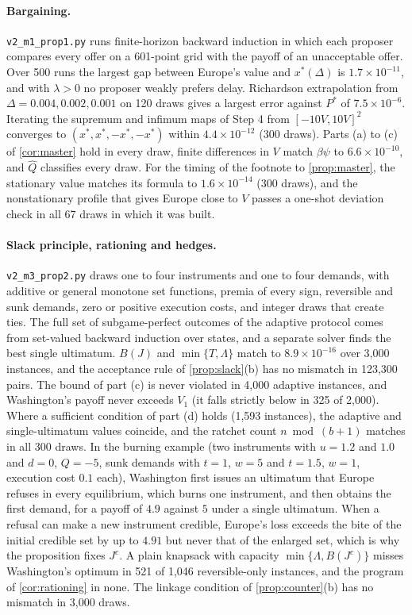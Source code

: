 \paragraph{Bargaining.} \texttt{v2\_m1\_prop1.py} runs finite-horizon backward induction in which each proposer compares every offer on a 601-point grid with the payoff of an unacceptable offer. Over 500 runs the largest gap between Europe's value and $x^*(\Delta)$ is $1.7\times10^{-11}$, and with $\lambda>0$ no proposer weakly prefers delay. Richardson extrapolation from $\Delta=0.004,0.002,0.001$ on 120 draws gives a largest error against $P^*$ of $7.5\times10^{-6}$. Iterating the supremum and infimum maps of Step 4 from $[-10V,10V]^2$ converges to $(x^*,x^*,-x^*,-x^*)$ within $4.4\times10^{-12}$ (300 draws). Parts (a) to (c) of \cref{cor:master} hold in every draw, finite differences in $V$ match $\beta\psi$ to $6.6\times10^{-10}$, and $\hat Q$ classifies every draw. For the timing of the footnote to \cref{prop:master}, the stationary value matches its formula to $1.6\times10^{-14}$ (300 draws), and the nonstationary profile that gives Europe close to $V$ passes a one-shot deviation check in all 67 draws in which it was built.

\paragraph{Slack principle, rationing and hedges.} \texttt{v2\_m3\_prop2.py} draws one to four instruments and one to four demands, with additive or general monotone set functions, premia of every sign, reversible and sunk demands, zero or positive execution costs, and integer draws that create ties. The full set of subgame-perfect outcomes of the adaptive protocol comes from set-valued backward induction over states, and a separate solver finds the best single ultimatum. $B(J)$ and $\min\{T,\Lambda\}$ match to $8.9\times10^{-16}$ over 3,000 instances, and the acceptance rule of \cref{prop:slack}(b) has no mismatch in 123,300 pairs. The bound of part (c) is never violated in 4,000 adaptive instances, and Washington's payoff never exceeds $V_1$ (it falls strictly below in 325 of 2,000). Where a sufficient condition of part (d) holds (1,593 instances), the adaptive and single-ultimatum values coincide, and the ratchet count $n\bmod(b+1)$ matches in all 300 draws. In the burning example (two instruments with $u=1.2$ and $1.0$ and $d=0$, $Q=-5$, sunk demands with $t=1$, $w=5$ and $t=1.5$, $w=1$, execution cost $0.1$ each), Washington first issues an ultimatum that Europe refuses in every equilibrium, which burns one instrument, and then obtains the first demand, for a payoff of $4.9$ against $5$ under a single ultimatum. When a refusal can make a new instrument credible, Europe's loss exceeds the bite of the initial credible set by up to $4.91$ but never that of the enlarged set, which is why the proposition fixes $J^c$. A plain knapsack with capacity $\min\{\Lambda,B(J^c)\}$ misses Washington's optimum in 521 of 1,046 reversible-only instances, and the program of \cref{cor:rationing} in none. The linkage condition of \cref{prop:counter}(b) has no mismatch in 3,000 draws.

